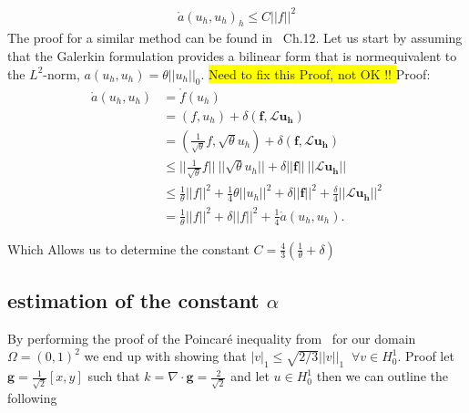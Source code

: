 \begin{align}
	\mathring{a}(u_h,u_h)_h \leq C ||f||^2
	\label{eq:stabilityResult}
\end{align}
The proof for a similar method can be found in~\cite{Quarteroni} Ch.12. 
Let us start by assuming that the Galerkin formulation provides a bilinear form that is normequivalent to the $L^2$-norm, $a(u_h,u_h)= \theta||u_h||_0$. 
\colorbox{yellow}{Need to fix this Proof, not OK !! }
Proof:
\begin{align}
	\mathring{a}(u_h,u_h) &= \mathring{f}(u_h) \\
	&= (f,u_h) + \delta(\mathbf{f},\mathcal{L}\mathbf{u_h}) \\
	&= (\frac{1}{\sqrt{\theta}}f,\sqrt{\theta}u_h) + \delta(\mathbf{f},\mathcal{L}\mathbf{u_h}) \\
	&\leq ||\frac{1}{\sqrt{\theta}}f||\:||\sqrt{\theta}u_h||+\delta||\mathbf{f}||\:||\mathcal{L}\mathbf{u_h}|| \\
	&\leq \frac{1}{\theta}||f||^2 + \frac{1}{4}\theta||u_h||^2 + \delta||\mathbf{f}||^2 + \frac{\delta}{4}||\mathcal{L}\mathbf{u_h}||^2 \\
	&= \frac{1}{\theta}||f||^2 + \delta||f||^2 + \frac{1}{4}\mathring{a}(u_h,u_h).
	\label{eq:derivationStabilityResult}
\end{align}

Which Allows us to determine the constant $C= \frac{4}{3}(\frac{1}{\theta}+\delta)$






\subsection{estimation of the constant $\alpha$}

By performing the proof of the Poincar\'e inequality from~\cite{Quarteroni} for our domain $\Omega=(0,1)^2$ we end up with showing that $|v|_1\leq \sqrt{2/3}||v||_1 \;\; \forall v \in H^1_0$. 
Proof
let $\mathbf{g} = \frac{1}{\sqrt{2}}[x,y]$ such that $k = \nabla \cdot \mathbf{g}=\frac{2}{\sqrt{2}}$ and let $u \in H_0^1$ then we can outline the following

